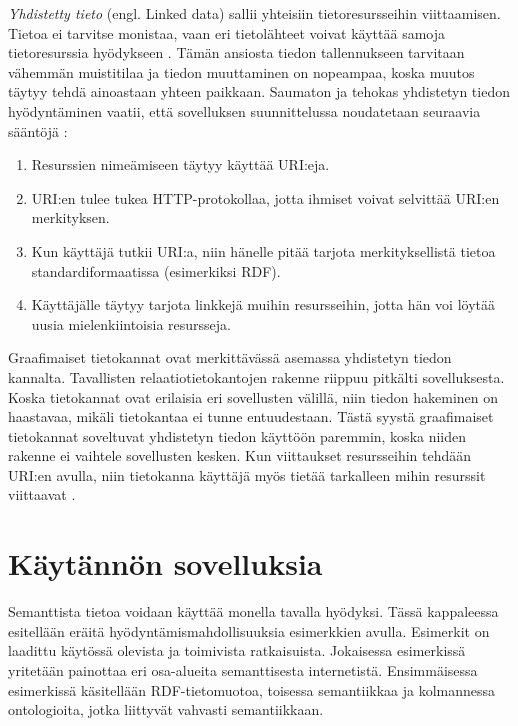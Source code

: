 \documentclass[finnish, 12pt, a4paper, elec, utf8, pdfa, online]{aaltothesis}
\begin{document}
{\textit{Yhdistetty tieto} (engl. Linked data) sallii yhteisiin tietoresursseihin viittaamisen. Tietoa ei tarvitse monistaa, vaan eri tietolähteet voivat käyttää samoja tietoresurssia hyödykseen \cite{linked_data_finlad}. Tämän ansiosta tiedon tallennukseen tarvitaan vähemmän muistitilaa ja tiedon muuttaminen on nopeampaa, koska muutos täytyy tehdä ainoastaan yhteen paikkaan. Saumaton ja tehokas yhdistetyn tiedon hyödyntäminen vaatii, että sovelluksen suunnittelussa noudatetaan seuraavia sääntöjä \cite{cambridge_linked}:
\begin{enumerate}
\item Resurssien nimeämiseen täytyy käyttää URI:eja.
\item URI:en tulee tukea HTTP-protokollaa, jotta ihmiset voivat selvittää URI:en merkityksen.
\item Kun käyttäjä tutkii URI:a, niin hänelle pitää tarjota merkityksellistä tietoa standardiformaatissa (esimerkiksi RDF).
\item Käyttäjälle täytyy tarjota linkkejä muihin resursseihin, jotta hän voi löytää uusia mielenkiintoisia resursseja.
\end{enumerate}
\vspace{0.5cm}

Graafimaiset tietokannat ovat merkittävässä asemassa yhdistetyn tiedon kannalta. Tavallisten relaatiotietokantojen rakenne riippuu pitkälti sovelluksesta. Koska tietokannat ovat erilaisia eri sovellusten välillä, niin tiedon hakeminen on haastavaa, mikäli tietokantaa ei tunne entuudestaan. Tästä syystä graafimaiset tietokannat soveltuvat yhdistetyn tiedon käyttöön paremmin, koska niiden rakenne ei vaihtele sovellusten kesken. Kun viittaukset resursseihin tehdään URI:en avulla, niin tietokanna käyttäjä myös tietää tarkalleen mihin resurssit viittaavat \cite{cambridge_linked}.

\clearpage
\section{Käytännön sovelluksia}

Semanttista tietoa voidaan käyttää monella tavalla hyödyksi. Tässä kappaleessa esitellään eräitä hyödyntämismahdollisuuksia esimerkkien avulla. Esimerkit on laadittu käytössä olevista ja toimivista ratkaisuista. Jokaisessa esimerkissä yritetään painottaa eri osa-alueita semanttisesta internetistä. Ensimmäisessa esimerkissä käsitellään RDF-tietomuotoa, toisessa semantiikkaa ja kolmannessa ontologioita, jotka liittyvät vahvasti semantiikkaan.


}
\end{document}
